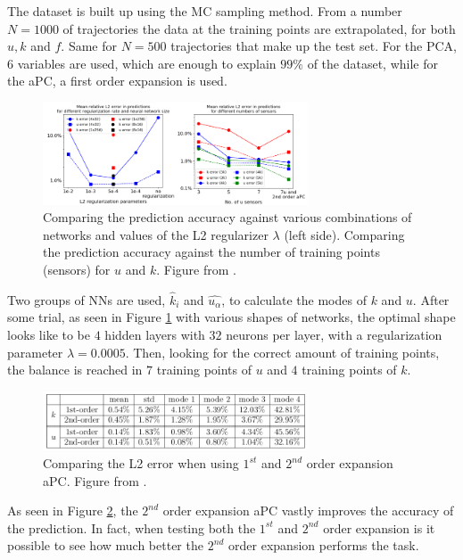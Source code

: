 \documentclass[11pt,a4paper]{article}
\begin{document}
The dataset is built up using the MC sampling method. From a number \(N = 1000\) of trajectories the data at the training points are extrapolated, for both \(u, k\) and \(f\). Same for \(N=500\) trajectories that make up the test set. For the PCA, 6 variables are used, which are enough to explain \(99\%\) of the dataset, while for the aPC, a first order expansion is used.
\begin{figure}[H]
    \centering 
    \includegraphics[width=0.7\textwidth]{Images/L2Error_inv_pbl.png}
    \captionsetup{justification=centering,margin=1cm}
    \caption{Comparing the prediction accuracy against various combinations of networks and values of the L2 regularizer \(\lambda\) (left side). Comparing the prediction accuracy against the number of training points (sensors) for \(u\) and \(k\). Figure from \cite{Zhang_2019}.}
    \label{fig:regularization}
\end{figure}
Two groups of NNs are used, \(\hat{k}_i\) and \(\hat{u_\alpha}\), to calculate the modes of \(k\) and \(u\). After some trial, as seen in Figure \ref{fig:regularization} with various shapes of networks, the optimal shape looks like to be \(4\) hidden layers with \(32\) neurons per layer, with a regularization parameter \(\lambda=0.0005\). Then, looking for the correct amount of training points, the balance is reached in \(7\) training points of \(u\) and \(4\) training points of \(k\).
\begin{figure}[H]
    \centering 
    \includegraphics[width=0.7\textwidth]{Images/Table_L2_Error.png}
    \captionsetup{justification=centering,margin=1cm}
    \caption{Comparing the L2 error when using \(1^{st}\) and \(2^{nd}\) order expansion aPC. Figure from \cite{Zhang_2019}.}
    \label{fig:table}
\end{figure}
As seen in Figure \ref{fig:table}, the \(2^{nd}\) order expansion aPC vastly improves the accuracy of the prediction. In fact, when testing both the \(1^{st}\) and \(2^{nd}\) order expansion is it possible to see how much better the \(2^{nd}\) order expansion performs the task. 
\end{document}
